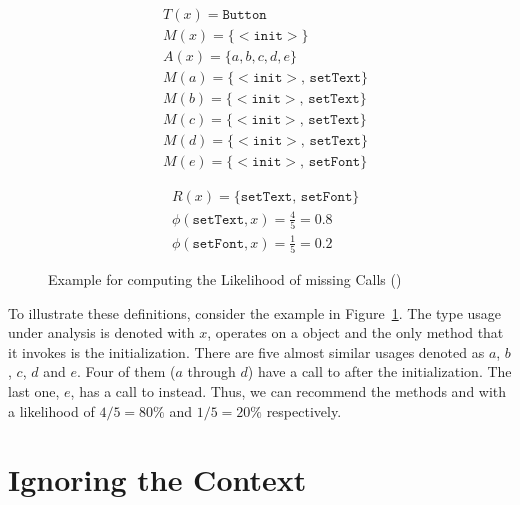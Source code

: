 \begin{figure}[h]
    \begin{subfigure}[c]{0.45\textwidth}
        \begin{align*}
& T(x) = \mathtt{Button} \\
& M(x) = \{ \mathtt{<\!\!init\!\!>} \} \\
& A(x) = \{ a, b, c, d, e \} \\
& M(a) = \{ \mathtt{<\!\!init\!\!>},\, \mathtt{setText} \} \\
& M(b) = \{ \mathtt{<\!\!init\!\!>},\, \mathtt{setText} \} \\
& M(c) = \{ \mathtt{<\!\!init\!\!>},\, \mathtt{setText} \} \\
& M(d) = \{ \mathtt{<\!\!init\!\!>},\, \mathtt{setText} \} \\
& M(e) = \{ \mathtt{<\!\!init\!\!>},\, \mathtt{setFont} \}
        \end{align*}
    \end{subfigure}
    \begin{subfigure}[c]{0.45\textwidth}
        \begin{align*}
& R(x) = \{ \mathtt{setText},\, \mathtt{setFont} \} \\
& \phi(\mathtt{setText}, x) = \frac{4}{5} = 0.8 \\
& \phi(\mathtt{setFont}, x) = \frac{1}{5} = 0.2
        \end{align*}
    \end{subfigure}
    \caption{Example for computing the Likelihood of missing Calls (\cite{monperrus2013detecting})}\label{fig:missing_calls}
\end{figure}

To illustrate these definitions, consider the example in Figure~\ref{fig:missing_calls}.
The type usage under analysis is denoted with $x$, operates on a  object and the only method that it invokes is the initialization.
There are five almost similar usages denoted as $a$, $b$, $c$, $d$ and $e$.
Four of them ($a$ through $d$) have a call to  after the initialization.
The last one, $e$, has a call to  instead.
Thus, we can recommend the methods  and  with a likelihood of $4/5 = 80\%$ and $1/5 = 20\%$ respectively.

\section{Ignoring the Context}

